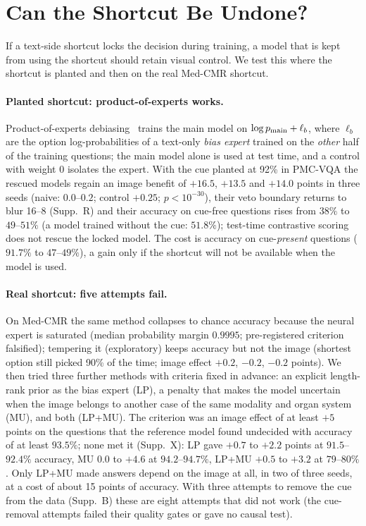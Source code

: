 \section{Can the Shortcut Be Undone?}
\label{sec:remedy}

If a text-side shortcut locks the decision during training, a model that is kept from using the shortcut should retain visual control.
We test this where the shortcut is planted and then on the real Med-CMR shortcut.

\paragraph{Planted shortcut: product-of-experts works.}
Product-of-experts debiasing~\cite{clark2019dont,cadene2019rubi} trains the main model on $\log p_{\rm main}+\ell_b$, where $\ell_b$ are the option log-probabilities of a text-only \emph{bias expert} trained on the \emph{other} half of the training questions; the main model alone is used at test time, and a control with weight $0$ isolates the expert.
With the cue planted at 92\% in PMC-VQA the rescued models regain an image benefit of $+16.5$, $+13.5$ and $+14.0$ points in three seeds (naive: $0.0$--$0.2$; control $+0.25$; $p<10^{-30}$), their veto boundary returns to blur 16--8 (Supp.~R) and their accuracy on cue-free questions rises from $38\%$ to $49$--$51\%$ (a model trained without the cue: $51.8\%$); test-time contrastive scoring does not rescue the locked model.
The cost is accuracy on cue-\emph{present} questions ($91.7\%$ to $47$--$49\%$), a gain only if the shortcut will not be available when the model is used.

\paragraph{Real shortcut: five attempts fail.}
On Med-CMR the same method collapses to chance accuracy because the neural expert is saturated (median probability margin $0.9995$; pre-registered criterion falsified); tempering it (exploratory) keeps accuracy but not the image (shortest option still picked 90\% of the time; image effect $+0.2$, $-0.2$, $-0.2$ points).
We then tried three further methods with criteria fixed in advance: an explicit length-rank prior as the bias expert (LP), a penalty that makes the model uncertain when the image belongs to another case of the same modality and organ system (MU), and both (LP+MU).
The criterion was an image effect of at least $+5$ points on the questions that the reference model found undecided with accuracy of at least $93.5\%$; none met it (Supp.~X): LP gave $+0.7$ to $+2.2$ points at $91.5$--$92.4\%$ accuracy, MU $0.0$ to $+4.6$ at $94.2$--$94.7\%$, LP+MU $+0.5$ to $+3.2$ at $79$--$80\%$.
Only LP+MU made answers depend on the image at all, in two of three seeds, at a cost of about 15 points of accuracy.
With three attempts to remove the cue from the data (Supp.~B) these are eight attempts that did not work (the cue-removal attempts failed their quality gates or gave no causal test).

